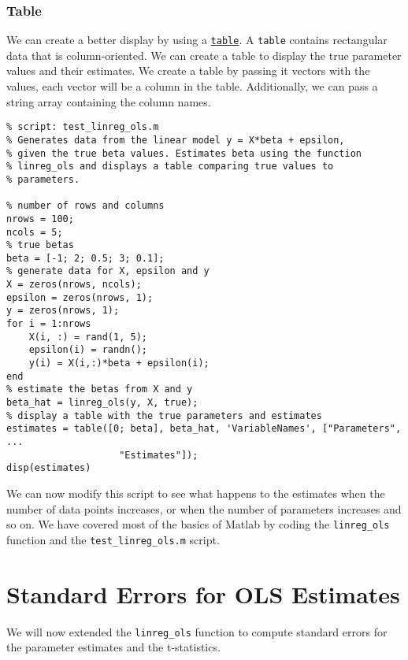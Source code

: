 \documentclass[12pt, a4paper]{article}
\begin{document}
\subsubsection{Table}
\label{sec:orgfdb5cb0}
We can create a better display by using a \href{https://www.mathworks.com/help/matlab/ref/table.html\#d117e1339894}{\texttt{table}}.
A \texttt{table} contains rectangular data that is column-oriented.
We can create a table to display the true parameter values and their estimates.
We create a table by passing it vectors with the values, each vector will be a column in the table.
Additionally, we can pass a string array containing the column names.
\lstset{language=matlab,label= ,caption= ,captionpos=b,firstnumber=1,numbers=left,style=Matlab-editor}
\begin{lstlisting}
% script: test_linreg_ols.m
% Generates data from the linear model y = X*beta + epsilon,
% given the true beta values. Estimates beta using the function
% linreg_ols and displays a table comparing true values to
% parameters.

% number of rows and columns
nrows = 100;
ncols = 5;
% true betas
beta = [-1; 2; 0.5; 3; 0.1];
% generate data for X, epsilon and y
X = zeros(nrows, ncols);
epsilon = zeros(nrows, 1);
y = zeros(nrows, 1);
for i = 1:nrows
    X(i, :) = rand(1, 5);
    epsilon(i) = randn();
    y(i) = X(i,:)*beta + epsilon(i);
end
% estimate the betas from X and y
beta_hat = linreg_ols(y, X, true);
% display a table with the true parameters and estimates
estimates = table([0; beta], beta_hat, 'VariableNames', ["Parameters", ...
                    "Estimates"]);
disp(estimates)
\end{lstlisting}

We can now modify this script to see what happens to the estimates when the number of data points increases, or when the number of parameters increases and so on.
We have covered most of the basics of Matlab by coding the \texttt{linreg\_ols} function and the \texttt{test\_linreg\_ols.m} script.
\section{Standard Errors for OLS Estimates}
\label{sec:orgf65fa21}
We will now extended the \texttt{linreg\_ols} function to compute standard errors for the parameter estimates and the t-statistics.
\end{document}
